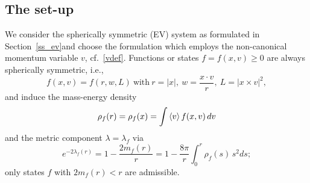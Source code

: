 \documentclass[11pt]{article}
\begin{document}
\subsection{The set-up}
\label{evstab_setup}
%
%
We consider the spherically symmetric (EV) system as formulated in
Section~\ref{ss_ev}and choose the formulation which employs the
non-canonical momentum variable $v$, cf.~\eqref{vdef}.
Functions or states $f=f(x,v)\geq 0$ are always spherically symmetric, i.e.,
\begin{equation} \label{rwL_ev}
  f(x,v)=f(r,w,L)\ \mbox{with}\ r=|x|,\ w=\frac{x\cdot v}{r},\
  L=|x\times v|^2,
\end{equation}
and induce the mass-energy density
\[
\rho_f (r)=\rho_f (x) = \int \left\langle v\right\rangle f(x,v)\,dv
\]
and the metric component $\lambda=\lambda_f$ via
\begin{equation} \label{lambdadef}
  e^{-2\lambda_f(r)} = 1-\frac{2 m_f(r)}{r}
  = 1 - \frac{8\pi}{r} \int_0^r \rho_f(s)\, s^2 ds;
\end{equation}
only states $f$ with $2 m_f (r) < r$ are admissible.
\end{document}
